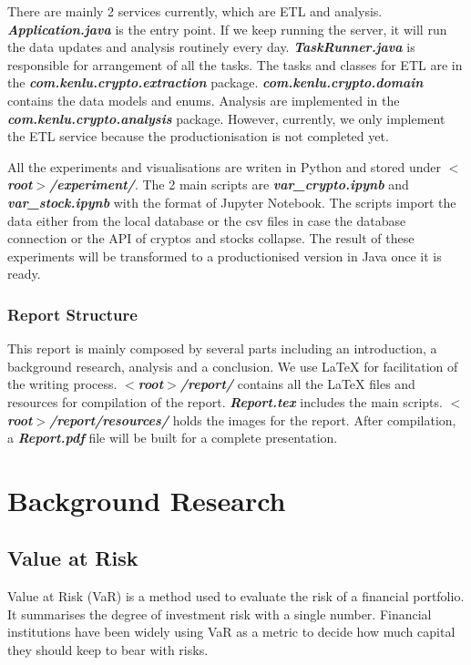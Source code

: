 \documentclass[11pt]{article} %
\theoremstyle{plain}
\theoremstyle{definition}
\begin{document}
There are mainly 2 services currently, which are ETL and analysis. \textsl{\textbf{Application.java}} is the entry point. If we keep running the server, it will run the data updates and analysis routinely every day. \textsl{\textbf{TaskRunner.java}} is responsible for arrangement of all the tasks. The tasks and classes for ETL are in the \textsl{\textbf{com.kenlu.crypto.extraction}} package. \textsl{\textbf{com.kenlu.crypto.domain}} contains the data models and enums. Analysis are implemented in the \textsl{\textbf{com.kenlu.crypto.analysis}} package. However, currently, we only implement the ETL service because the productionisation is not completed yet.

All the experiments and visualisations are writen in Python and stored under \textsl{\textbf{$<$root$>$/experiment/}}. The 2 main scripts are \textsl{\textbf{var\_crypto.ipynb}} and \textsl{\textbf{var\_stock.ipynb}} with the format of Jupyter Notebook. The scripts import the data either from the local database or the csv files in case the database connection or the API of cryptos and stocks collapse. The result of these experiments will be transformed to a productionised version in Java once it is ready.

\subsubsection{Report Structure}

This report is mainly composed by several parts including an introduction, a background research, analysis and a conclusion. We use LaTeX for facilitation of the writing process. \textsl{\textbf{$<$root$>$/report/}} contains all the LaTeX files and resources for compilation of the report. \textsl{\textbf{Report.tex}} includes the main scripts. \textsl{\textbf{$<$root$>$/report/resources/}} holds the images for the report. After compilation, a \textsl{\textbf{Report.pdf}} file will be built for a complete presentation.

\section{Background Research}
\subsection{Value at Risk}
Value at Risk (VaR) is a method used to evaluate the risk of a financial portfolio. It summarises the degree of investment risk with a single number. Financial institutions have been widely using VaR as a metric to decide how much capital they should keep to bear with risks.
\end{document}
